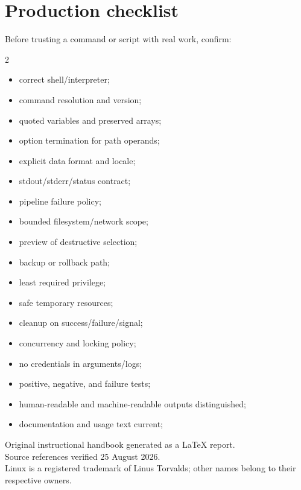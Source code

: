 \documentclass[11pt,oneside,openany]{book}
\begin{document}
\backmatter
\chapter*{Production checklist}
Before trusting a command or script with real work, confirm:
\begin{multicols}{2}
\begin{itemize}
  \item correct shell/interpreter;
  \item command resolution and version;
  \item quoted variables and preserved arrays;
  \item option termination for path operands;
  \item explicit data format and locale;
  \item stdout/stderr/status contract;
  \item pipeline failure policy;
  \item bounded filesystem/network scope;
  \item preview of destructive selection;
  \item backup or rollback path;
  \item least required privilege;
  \item safe temporary resources;
  \item cleanup on success/failure/signal;
  \item concurrency and locking policy;
  \item no credentials in arguments/logs;
  \item positive, negative, and failure tests;
  \item human-readable and machine-readable outputs distinguished;
  \item documentation and usage text current;
\end{itemize}
\end{multicols}

\vfill
\begin{center}
\color{Muted}\small
Original instructional handbook generated as a LaTeX report.\\
Source references verified 25 August 2026.\\
Linux is a registered trademark of Linus Torvalds; other names belong to their respective owners.
\end{center}
\end{document}
